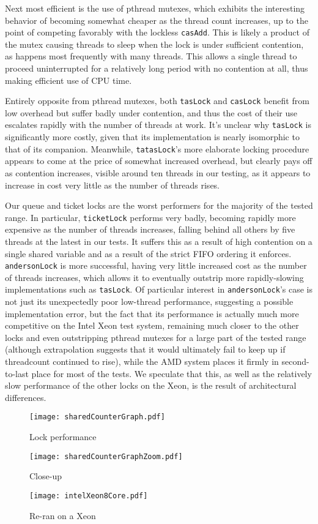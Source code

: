 \documentclass[letterpaper]{article}
\begin{document}
Next most efficient is the use of pthread mutexes, which exhibits the interesting behavior of becoming somewhat cheaper as the thread count increases, up to the point of competing favorably with the lockless \texttt{casAdd}.  This is likely a product of the mutex causing threads to sleep when the lock is under sufficient contention, as happens most frequently with many threads.  This allows a single thread to proceed uninterrupted for a relatively long period with no contention at all, thus making efficient use of CPU time.

Entirely opposite from pthread mutexes, both \texttt{tasLock} and \texttt{casLock} benefit from low overhead but suffer badly under contention, and thus the cost of their use escalates rapidly with the number of threads at work.  It's unclear why \texttt{tasLock} is significantly more costly, given that its implementation is nearly isomorphic to that of its companion.  Meanwhile, \texttt{tatasLock}'s more elaborate locking procedure appears to come at the price of somewhat increased overhead, but clearly pays off as contention increases, visible around ten threads in our testing, as it appears to increase in cost very little as the number of threads rises.

Our queue and ticket locks are the worst performers for the majority of the tested range.  In particular, \texttt{ticketLock} performs very badly, becoming rapidly more expensive as the number of threads increases, falling behind all others by five threads at the latest in our tests.  It suffers this as a result of high contention on a single shared variable and as a result of the strict FIFO ordering it enforces.  \texttt{andersonLock} is more successful, having very little increased cost as the number of threads increases, which allows it to eventually outstrip more rapidly-slowing implementations such as \texttt{tasLock}.  Of particular interest in \texttt{andersonLock}'s case is not just its unexpectedly poor low-thread performance, suggesting a possible implementation error, but the fact that its performance is actually much more competitive on the Intel Xeon test system, remaining much closer to the other locks and even outstripping pthread mutexes for a large part of the tested range (although extrapolation suggests that it would ultimately fail to keep up if threadcount continued to rise), while the AMD system places it firmly in second-to-last place for most of the tests.  We speculate that this, as well as the relatively slow performance of the other locks on the Xeon, is the result of architectural differences.

\begin{figure*}[t]
\centering
\texttt{[image: sharedCounterGraph.pdf]}
\caption{Lock performance}
\end{figure*}
\begin{figure*}[t]
\centering
\texttt{[image: sharedCounterGraphZoom.pdf]}
\caption{Close-up}
\end{figure*}
\begin{figure*}[t]
\centering
\texttt{[image: intelXeon8Core.pdf]}
\caption{Re-ran on a Xeon}
\end{figure*}
\end{document}
